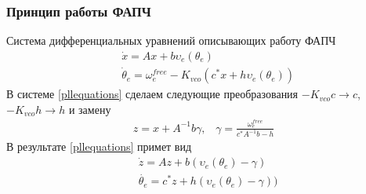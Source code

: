 \documentclass{beamer}
\begin{document}
\begin{frame}
\frametitle{Принцип работы ФАПЧ}
\begin{center}
\end{center}

Система дифференциальных уравнений описывающих работу ФАПЧ
 \begin{equation}\label{pllequations}
 \begin{aligned}
 &\dot{x} = Ax + b\upsilon_e(\theta_e) \\
 &\dot{\theta}_e = \omega_e^{free} - K_{vco}(c^*x + h\upsilon_e(\theta_e))
 \end{aligned}
\end{equation}
В системе \eqref{pllequations} сделаем следующие преобразования $-K_{vco}c \rightarrow c$, $-K_{vco}h \rightarrow h$ и замену
 \begin{equation}
 \begin{aligned}
 z = x + A^{-1}b\gamma  \text{,} \quad \gamma = \frac{\omega_e^{free}}{c^*A^{-1}b-h}
 \end{aligned}
\end{equation}
В результате \eqref{pllequations} примет вид
 \begin{equation}\label{system}
 \begin{aligned}
 &\dot{z} = Az + b(\upsilon_e(\theta_e) - \gamma) \\
 & \dot{\theta_e} = c^*z + h(\upsilon_e(\theta_e) - \gamma))
 \end{aligned}
\end{equation}
\end{frame}
\end{document}
